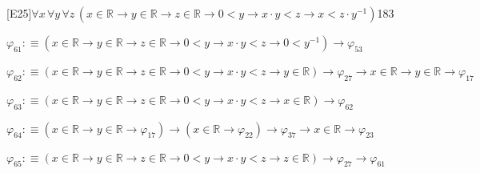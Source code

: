 \begin{fullproof}{[E25]}{$\forall x\,\forall y\,\forall z\,(x \in \mathbb{R} \to y \in \mathbb{R} \to z \in \mathbb{R} \to 0 < y \to x \cdot y < z \to x < z \cdot y^{-1})$}{183}
\begin{abbrevlist}
\item $\varphi_{61} :\equiv (x \in \mathbb{R} \to y \in \mathbb{R} \to z \in \mathbb{R} \to 0 < y \to x \cdot y < z \to 0 < y^{-1}) \to \varphi_{53}$
\item $\varphi_{62} :\equiv (x \in \mathbb{R} \to y \in \mathbb{R} \to z \in \mathbb{R} \to 0 < y \to x \cdot y < z \to y \in \mathbb{R}) \to \varphi_{27} \to x \in \mathbb{R} \to y \in \mathbb{R} \to \varphi_{17}$
\item $\varphi_{63} :\equiv (x \in \mathbb{R} \to y \in \mathbb{R} \to z \in \mathbb{R} \to 0 < y \to x \cdot y < z \to x \in \mathbb{R}) \to \varphi_{62}$
\item $\varphi_{64} :\equiv (x \in \mathbb{R} \to y \in \mathbb{R} \to \varphi_{17}) \to (x \in \mathbb{R} \to \varphi_{22}) \to \varphi_{37} \to x \in \mathbb{R} \to \varphi_{23}$
\item $\varphi_{65} :\equiv (x \in \mathbb{R} \to y \in \mathbb{R} \to z \in \mathbb{R} \to 0 < y \to x \cdot y < z \to z \in \mathbb{R}) \to \varphi_{27} \to \varphi_{61}$
\end{abbrevlist}
\end{fullproof}
